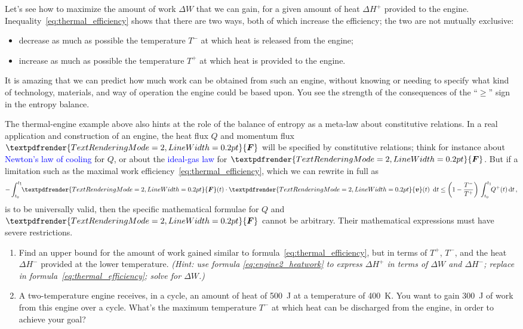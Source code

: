 \documentclass[a4paper,12pt,%
onecolumn,oneside,%
british%
]{memoir}
\renewcommand*{\bm}[1]{\textpdfrender{TextRenderingMode=2,LineWidth=0.2pt}{\boldsymbol{#1}}}
\newcommand*{\di}{\mathop{}\!\mathrm{d}}%
\newcommand*{\incr}{\Delta}%
\renewcommand*{\|}[1][]{\nonscript\:#1\vert\nonscript\:\mathopen{}}
\newcommand*{\sect}{\S}%
\renewcommand*{\autoref}[3][\sect\,\ref]{\textcolor{blue}{#3}
\raisebox{0.6ex}{\color{blue}\miniscule%
\faIcon{angle-right}%
\;#1{#2}\;p.\,\pageref{#2}}}
\newcommand*{\yv}{\bm{v}}
\newcommand*{\yti}{t_{0}}
\newcommand*{\ytf}{t_{1}}
\newcommand*{\dt}{\di t}
\newcommand*{\yQ}{Q}%
\newcommand*{\yQp}{\yQ^{+}}%
\newcommand*{\yhep}{\incr H^{+}}%
\newcommand*{\yhem}{\incr H^{-}}%
\newcommand*{\yW}{\incr W}%
\newcommand*{\yF}{\bm{F}}
\newcommand*{\yT}{T}%
\newcommand*{\yTp}{\yT^{+}}%
\newcommand*{\yTm}{\yT^{-}}%
\begin{document}
Let's see how to maximize the amount of work $\yW$ that we can gain, for a given amount of heat $\yhep$ provided to the engine. Inequality~\eqref{eq:thermal_efficiency} shows that there are two ways, both of which increase the efficiency; the two are not mutually exclusive:
\begin{itemize}
\item decrease as much as possible the temperature $\yTm$ at which heat is released from the engine;
\item increase as much as possible the temperature $\yTp$ at which heat is provided to the engine.
\end{itemize}

\medskip

It is amazing that we can predict how much work can be obtained from such an engine, without knowing or needing to specify what kind of technology, materials, and way of operation the engine could be based upon. You see the strength of the consequences of the \enquote{$\ge$} sign in the entropy balance.

The thermal-engine example above also hints at the role of the balance of entropy as a meta-law about constitutive relations. In a real application and construction of an engine, the heat flux $\yQ$ and momentum flux $\yF$ will be specified by constitutive relations; think for instance about \autoref{def:newton_cooling}{Newton's law of cooling} for $\yQ$, or about the \autoref{def:idealgas_law}{ideal-gas law} for $\yF$. But if a limitation such as the maximal work efficiency~\eqref{eq:thermal_efficiency}, which we can rewrite in full as
\begin{equation*}
  -\int_{\yti}^{\ytf}\!\!\yF(t)\cdot\yv(t)\ \dt
  \le
  \biggl(1-\frac{\yTm}{\yTp}\biggr)\,
  \int_{\yti}^{\ytf}\!\!\yQp(t)\dt \,,
\end{equation*}
is to be universally valid, then the specific mathematical formulae for $\yQ$ and $\yF$ cannot be arbitrary. Their mathematical expressions must have severe restrictions.


\begin{exercise}
  \begin{enumerate}[exerc]
  \item Find an upper bound for the amount of work gained similar to formula~\eqref{eq:thermal_efficiency}, but in terms of $\yTp$, $\yTm$, and the heat $\yhem$ provided at the lower temperature. \emph{(Hint: use formula \eqref{eq:engine2_heatwork} to express $\yhep$ in terms of $\yW$ and $\yhem$; replace in formula~\eqref{eq:thermal_efficiency}; solve for $\yW$.)}

  \item A two-temperature engine receives, in a cycle, an amount of heat of \qty{500}{J} at a temperature of \qty{400}{K}. You want to gain \qty{300}{J} of work from this engine over a cycle. What's the maximum temperature $\yTm$ at which heat can be discharged from the engine, in order to achieve your goal?
  \end{enumerate}
\end{exercise}
\end{document}
